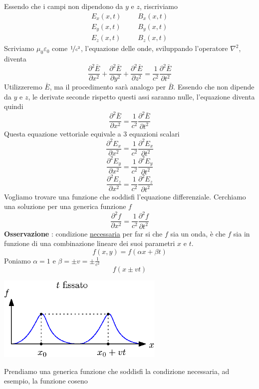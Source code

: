 \documentclass[10pt, letterpaper]{report}
\begin{document}
Essendo che i campi non dipendono da $y$ e $z$, riscriviamo
$$ \begin{matrix}
    E_x(x,t)\\ 
    E_y(x,t)\\ 
    E_z(x,t)
\end{matrix} \ \ \ \ \ \ \ \begin{matrix}
    B_x(x,t)\\ 
    B_y(x,t)\\ 
    B_z(x,t)
\end{matrix}$$
Scriviamo $\mu_0\varepsilon_0$ come $\nicefrac{1}{c^2}$, l'equazione delle onde, sviluppando l'operatore $\nabla^2$, diventa 
$$ \frac{\partial^2 \bar E}{\partial x^2}+
 \frac{\partial^2 \bar E}{\partial y^2}+
  \frac{\partial^2 \bar E}{\partial z^2}=
  \frac{1}{c^2} \frac{\partial^2 \bar E}{\partial t^2}$$
Utilizzeremo $\bar E$, ma il procedimento sarà analogo per $\bar B$. Essendo che non dipende da $y$ e $z$, le derivate seconde rispetto questi assi saranno nulle, l'equazione diventa quindi 
$$ \frac{\partial^2 \bar E}{\partial x^2}=
  \frac{1}{c^2} \frac{\partial^2 \bar E}{\partial t^2}$$
Questa equazione vettoriale equivale a 3 equazioni scalari 
$$ \frac{\partial^2  E_x}{\partial x^2}=
  \frac{1}{c^2} \frac{\partial^2 E_x}{\partial t^2}$$
$$ \frac{\partial^2  E_y}{\partial x^2}=
  \frac{1}{c^2} \frac{\partial^2 E_y}{\partial t^2}$$
  $$ \frac{\partial^2  E_z}{\partial x^2}=
  \frac{1}{c^2} \frac{\partial^2 E_z}{\partial t^2}$$
Vogliamo trovare una funzione che soddisfi l'equazione differenziale. Cerchiamo una soluzione per una generica funzione $f$
  $$ \frac{\partial^2  f}{\partial x^2}=
  \frac{1}{c^2} \frac{\partial^2 f}{\partial t^2}$$
  \textbf{Osservazione} : condizione \underline{necessaria} per far si che $f$ sia un onda, è che $f$ sia in funzione di una combinazione lineare dei suoi parametri $x$ e $t$. 
  $$ f(x,y)=f(\alpha x + \beta t)$$
Poniamo $\alpha=1$ e $\beta = \pm v = \pm \frac{1}{c^2}$
$$ f(x\pm vt)$$
\begin{center}
    \includegraphics[width=0.6\textwidth]{images/onda.eps}
\end{center}
Prendiamo una generica funzione che soddisfi la condizione necessaria, ad esempio, la funzione coseno 
\end{document}
